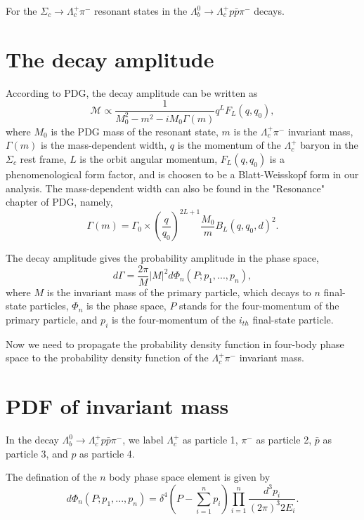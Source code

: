 \documentclass[12pt,a4paper]{article}
\begin{document}
For the $\Sigma_c \to \Lambda_c^+ \pi^-$ resonant states in the $\Lambda_b^0 \to \Lambda_c^+ p \bar{p} \pi^-$ decays. 
\section{The decay amplitude}
According to PDG, the decay amplitude can be written as  
\begin{equation}
\mathscr{M} \propto \frac{1}{M_{0}^2-m^2 -iM_{0}\Gamma(m)} q^L F_{L}(q,q_0), 
\end{equation} 
where $M_{0}$ is the PDG mass of the resonant state, $m$ is the $\Lambda_c^+ \pi^-$ invariant 
mass, $\Gamma(m)$ is the mass-dependent width, $q$ is the momentum of the $\Lambda_c^+$ baryon 
in the $\Sigma_c$ rest frame, $L$ is the orbit angular momentum, $F_{L}(q,q_0)$ is a phenomenological 
form factor, and is choosen to be a Blatt-Weisskopf form in our analysis.
The mass-dependent width can also be found in the "Resonance" chapter of PDG, namely, 
\begin{equation}
\Gamma(m) = \Gamma_0 \times \left(\frac{q}{q_0}\right)^{2L+1}\frac{M_0}{m}B_L(q,q_0,d)^2. 
\end{equation}  

The decay amplitude gives the probability amplitude in the phase space, 
\begin{equation}
d\Gamma = \frac{2\pi}{M} \left|M\right|^2 d\Phi_n(P; p_1, ..., p_n), 
\end{equation}
where $M$ is the invariant mass of the primary particle, which decays to $n$ final-state 
particles, $\Phi_n$ is the phase space, $P$ stands for the four-momentum of the primary particle, 
and $p_i$ is the four-momentum of the $i_{th}$ final-state particle.

Now we need to propagate the probability density function in four-body phase space to 
the probability density function of the $\Lambda_c^+ \pi^-$ invariant mass. 

\section{PDF of invariant mass}
In the decay $\Lambda_b^0 \to \Lambda_c^+ p \bar{p} \pi^-$, we label $\Lambda_c^+$ as particle 1, 
$\pi^-$ as particle 2, $\bar{p}$ as particle 3, and $p$ as particle 4.   

The defination of the $n$ body phase space element is given by 
\begin{equation}
d\Phi_n(P; p_1, ..., p_n) = \delta^4(P-\sum^n_{i=1} p_i) \prod_{i=1}^n \frac{d^3 p_i}{(2\pi)^3 2 E_i}. 
\end{equation} 
\end{document}
